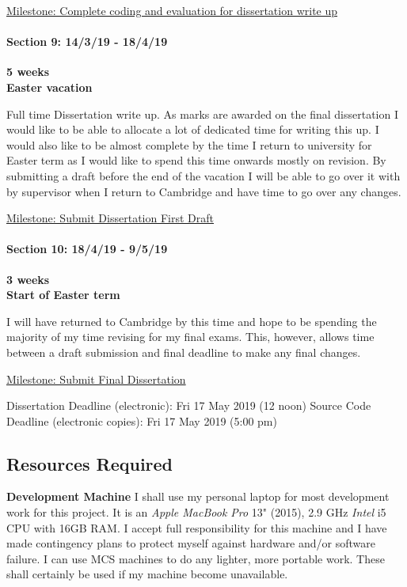 \documentclass[]{article}
\let\oldparagraph\paragraph
\renewcommand{\paragraph}[1]{\oldparagraph{#1}\mbox{}}
\begin{document}
\underline{Milestone: Complete coding and evaluation for dissertation
write up}

\paragraph{Section 9: 14/3/19 - 18/4/19}\label{header-n119}

\textbf{5 weeks}\\\textbf{Easter vacation}

Full time Dissertation write up. As marks are awarded on the final
dissertation I would like to be able to allocate a lot of dedicated time
for writing this up. I would also like to be almost complete by the time
I return to university for Easter term as I would like to spend this
time onwards mostly on revision. By submitting a draft before the end of
the vacation I will be able to go over it with by supervisor when I
return to Cambridge and have time to go over any changes.

\underline{Milestone: Submit Dissertation First Draft}

\paragraph{Section 10: 18/4/19 - 9/5/19}\label{header-n123}

\textbf{3 weeks}\\\textbf{Start of Easter term}

I will have returned to Cambridge by this time and hope to be spending
the majority of my time revising for my final exams. This, however,
allows time between a draft submission and final deadline to make any
final changes.

\underline{Milestone: Submit Final Dissertation}

Dissertation Deadline (electronic): Fri 17 May 2019 (12 noon) Source
Code Deadline (electronic copies): Fri 17 May 2019 (5:00 pm)

\subsection{Resources Required}\label{header-n129}

\textbf{Development Machine} I shall use my personal laptop for most
development work for this project. It is an \emph{Apple MacBook Pro} 13"
(2015), 2.9 GHz \emph{Intel} i5 CPU with 16GB RAM. I accept full
responsibility for this machine and I have made contingency plans to
protect myself against hardware and/or software failure. I can use MCS
machines to do any lighter, more portable work. These shall certainly be
used if my machine become unavailable.
\end{document}
